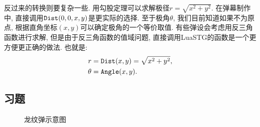 反过来的转换则要复杂一些.
用勾股定理可以求解极径$r = \sqrt{x^2 + y^2}$.
在弹幕制作中, 直接调用$\texttt{Dist}(0,0,x,y)$是更实际的选择.
至于极角$\theta$, 我们目前知道如果不为原点,
根据直角坐标$(x,y)$可以确定极角的一个等价取值.
有些弹设会考虑用反三角函数进行求解,
但是由于反三角函数的值域问题,
直接调用LuaSTG的\Angle 函数是一个更方便更正确的做法.
也就是:
\begin{align*}
  r      & = \texttt{Dist}(x,y) = \sqrt{x^2 + y^2}, \\
  \theta & = \texttt{Angle}(x,y).
\end{align*}

\subsection*{习题}

\begin{figure}[htbp]
  \centering
  \caption{龙纹弹示意图}
  \label{fig:long-wen-dan}
\end{figure}

